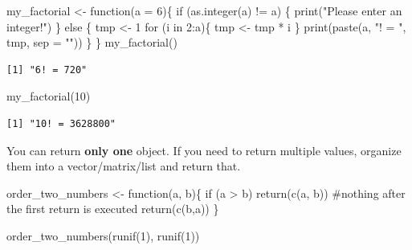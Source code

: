 \documentclass[
  letterpaper,
  DIV=11,
  numbers=noendperiod]{scrreprt}
\newenvironment{Shaded}{\begin{snugshade}}{\end{snugshade}}
\newcommand{\AttributeTok}[1]{\textcolor[rgb]{0.40,0.45,0.13}{#1}}
\newcommand{\CommentTok}[1]{\textcolor[rgb]{0.37,0.37,0.37}{#1}}
\newcommand{\ControlFlowTok}[1]{\textcolor[rgb]{0.00,0.23,0.31}{#1}}
\newcommand{\DecValTok}[1]{\textcolor[rgb]{0.68,0.00,0.00}{#1}}
\newcommand{\FunctionTok}[1]{\textcolor[rgb]{0.28,0.35,0.67}{#1}}
\newcommand{\NormalTok}[1]{\textcolor[rgb]{0.00,0.23,0.31}{#1}}
\newcommand{\OtherTok}[1]{\textcolor[rgb]{0.00,0.23,0.31}{#1}}
\newcommand{\SpecialCharTok}[1]{\textcolor[rgb]{0.37,0.37,0.37}{#1}}
\newcommand{\StringTok}[1]{\textcolor[rgb]{0.13,0.47,0.30}{#1}}
\begin{document}
\begin{Shaded}
\begin{Highlighting}[]
\NormalTok{my\_factorial }\OtherTok{\textless{}{-}} \ControlFlowTok{function}\NormalTok{(}\AttributeTok{a =} \DecValTok{6}\NormalTok{)\{}
  \ControlFlowTok{if}\NormalTok{ (}\FunctionTok{as.integer}\NormalTok{(a) }\SpecialCharTok{!=}\NormalTok{ a) \{}
    \FunctionTok{print}\NormalTok{(}\StringTok{"Please enter an integer!"}\NormalTok{)}
\NormalTok{  \} }\ControlFlowTok{else}\NormalTok{ \{}
\NormalTok{    tmp }\OtherTok{\textless{}{-}} \DecValTok{1}
    \ControlFlowTok{for}\NormalTok{ (i }\ControlFlowTok{in} \DecValTok{2}\SpecialCharTok{:}\NormalTok{a)\{}
\NormalTok{      tmp }\OtherTok{\textless{}{-}}\NormalTok{ tmp }\SpecialCharTok{*}\NormalTok{ i}
\NormalTok{    \}}
    \FunctionTok{print}\NormalTok{(}\FunctionTok{paste}\NormalTok{(a, }\StringTok{"! = "}\NormalTok{, tmp, }\AttributeTok{sep =} \StringTok{""}\NormalTok{))}
\NormalTok{  \}}
\NormalTok{\}}
\FunctionTok{my\_factorial}\NormalTok{()}
\end{Highlighting}
\end{Shaded}

\begin{verbatim}
[1] "6! = 720"
\end{verbatim}

\begin{Shaded}
\begin{Highlighting}[]
\FunctionTok{my\_factorial}\NormalTok{(}\DecValTok{10}\NormalTok{)}
\end{Highlighting}
\end{Shaded}

\begin{verbatim}
[1] "10! = 3628800"
\end{verbatim}

You can return \textbf{only one} object. If you need to return multiple
values, organize them into a vector/matrix/list and return that.

\begin{Shaded}
\begin{Highlighting}[]
\NormalTok{order\_two\_numbers }\OtherTok{\textless{}{-}} \ControlFlowTok{function}\NormalTok{(a, b)\{}
  \ControlFlowTok{if}\NormalTok{ (a }\SpecialCharTok{\textgreater{}}\NormalTok{ b) }\FunctionTok{return}\NormalTok{(}\FunctionTok{c}\NormalTok{(a, b)) }\CommentTok{\#nothing after the first return is executed}
  \FunctionTok{return}\NormalTok{(}\FunctionTok{c}\NormalTok{(b,a))}
\NormalTok{\}}

\FunctionTok{order\_two\_numbers}\NormalTok{(}\FunctionTok{runif}\NormalTok{(}\DecValTok{1}\NormalTok{), }\FunctionTok{runif}\NormalTok{(}\DecValTok{1}\NormalTok{))}
\end{Highlighting}
\end{Shaded}
\end{document}
